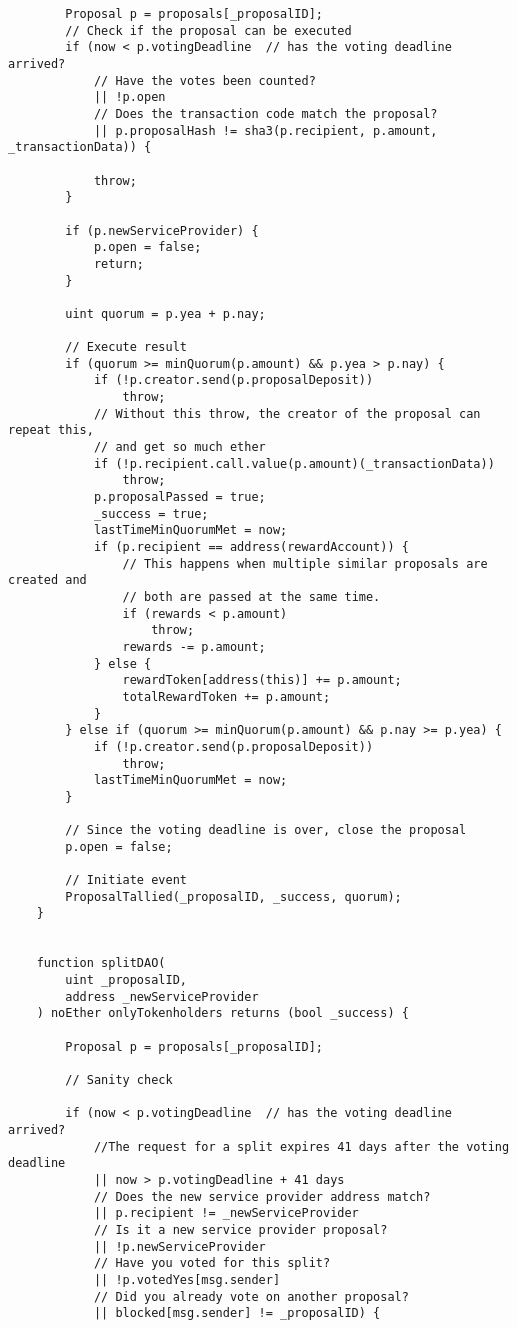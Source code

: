 \documentclass[9pt,oneside]{amsart}
\begin{document}
\begin{appendix}
\begin{verbatim}
        Proposal p = proposals[_proposalID];
        // Check if the proposal can be executed
        if (now < p.votingDeadline  // has the voting deadline arrived?
            // Have the votes been counted?
            || !p.open
            // Does the transaction code match the proposal?
            || p.proposalHash != sha3(p.recipient, p.amount, _transactionData)) {

            throw;
        }

        if (p.newServiceProvider) {
            p.open = false;
            return;
        }

        uint quorum = p.yea + p.nay;

        // Execute result
        if (quorum >= minQuorum(p.amount) && p.yea > p.nay) {
            if (!p.creator.send(p.proposalDeposit))
                throw;
            // Without this throw, the creator of the proposal can repeat this,
            // and get so much ether
            if (!p.recipient.call.value(p.amount)(_transactionData))
                throw;
            p.proposalPassed = true;
            _success = true;
            lastTimeMinQuorumMet = now;
            if (p.recipient == address(rewardAccount)) {
                // This happens when multiple similar proposals are created and
                // both are passed at the same time.
                if (rewards < p.amount)
                    throw;
                rewards -= p.amount;
            } else {
                rewardToken[address(this)] += p.amount;
                totalRewardToken += p.amount;
            }
        } else if (quorum >= minQuorum(p.amount) && p.nay >= p.yea) {
            if (!p.creator.send(p.proposalDeposit))
                throw;
            lastTimeMinQuorumMet = now;
        }

        // Since the voting deadline is over, close the proposal
        p.open = false;

        // Initiate event
        ProposalTallied(_proposalID, _success, quorum);
    }


    function splitDAO(
        uint _proposalID,
        address _newServiceProvider
    ) noEther onlyTokenholders returns (bool _success) {

        Proposal p = proposals[_proposalID];

        // Sanity check

        if (now < p.votingDeadline  // has the voting deadline arrived?
            //The request for a split expires 41 days after the voting deadline
            || now > p.votingDeadline + 41 days
            // Does the new service provider address match?
            || p.recipient != _newServiceProvider
            // Is it a new service provider proposal?
            || !p.newServiceProvider
            // Have you voted for this split?
            || !p.votedYes[msg.sender]
            // Did you already vote on another proposal?
            || blocked[msg.sender] != _proposalID) {


\end{verbatim}
\end{appendix}
\end{document}
